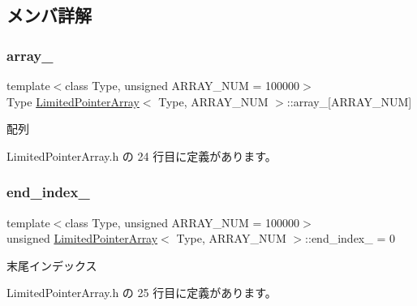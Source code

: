 \subsection{メンバ詳解}
\mbox{\label{class_limited_pointer_array_a80e958d7818fc6ee0e757b56abc937a4}} 
\subsubsection{\texorpdfstring{array\+\_\+}{array\_}}
{\footnotesize\ttfamily template$<$class Type, unsigned A\+R\+R\+A\+Y\+\_\+\+N\+UM = 100000$>$ \\
Type \mbox{\hyperlink{class_limited_pointer_array}{Limited\+Pointer\+Array}}$<$ Type, A\+R\+R\+A\+Y\+\_\+\+N\+UM $>$\+::array\+\_\+\mbox{[}A\+R\+R\+A\+Y\+\_\+\+N\+UM\mbox{]}\hspace{0.3cm}{\ttfamily [private]}}



配列 



 Limited\+Pointer\+Array.\+h の 24 行目に定義があります。

\mbox{\label{class_limited_pointer_array_a43624d44d694257ed3f1a49b74b543a3}} 
\subsubsection{\texorpdfstring{end\+\_\+index\+\_\+}{end\_index\_}}
{\footnotesize\ttfamily template$<$class Type, unsigned A\+R\+R\+A\+Y\+\_\+\+N\+UM = 100000$>$ \\
unsigned \mbox{\hyperlink{class_limited_pointer_array}{Limited\+Pointer\+Array}}$<$ Type, A\+R\+R\+A\+Y\+\_\+\+N\+UM $>$\+::end\+\_\+index\+\_\+ = 0\hspace{0.3cm}{\ttfamily [private]}}



末尾インデックス 



 Limited\+Pointer\+Array.\+h の 25 行目に定義があります。

